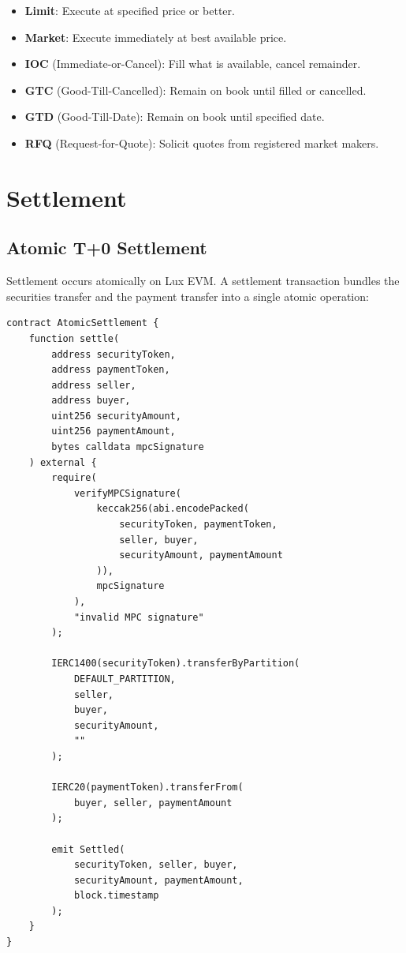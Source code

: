 \documentclass[11pt,a4paper]{article}
\begin{document}
\begin{itemize}[nosep]
  \item \textbf{Limit}: Execute at specified price or better.
  \item \textbf{Market}: Execute immediately at best available price.
  \item \textbf{IOC} (Immediate-or-Cancel): Fill what is available, cancel remainder.
  \item \textbf{GTC} (Good-Till-Cancelled): Remain on book until filled or cancelled.
  \item \textbf{GTD} (Good-Till-Date): Remain on book until specified date.
  \item \textbf{RFQ} (Request-for-Quote): Solicit quotes from registered market makers.
\end{itemize}

\section{Settlement}\label{sec:settlement}

\subsection{Atomic T+0 Settlement}

Settlement occurs atomically on Lux EVM. A settlement transaction bundles the securities transfer and the payment transfer into a single atomic operation:

\begin{lstlisting}[language=Solidity,caption={Atomic settlement contract.}]
contract AtomicSettlement {
    function settle(
        address securityToken,
        address paymentToken,
        address seller,
        address buyer,
        uint256 securityAmount,
        uint256 paymentAmount,
        bytes calldata mpcSignature
    ) external {
        require(
            verifyMPCSignature(
                keccak256(abi.encodePacked(
                    securityToken, paymentToken,
                    seller, buyer,
                    securityAmount, paymentAmount
                )),
                mpcSignature
            ),
            "invalid MPC signature"
        );

        IERC1400(securityToken).transferByPartition(
            DEFAULT_PARTITION,
            seller,
            buyer,
            securityAmount,
            ""
        );

        IERC20(paymentToken).transferFrom(
            buyer, seller, paymentAmount
        );

        emit Settled(
            securityToken, seller, buyer,
            securityAmount, paymentAmount,
            block.timestamp
        );
    }
}
\end{lstlisting}
\end{document}
